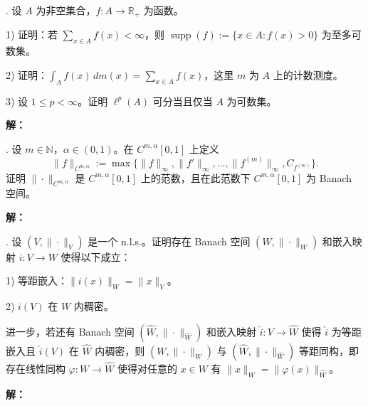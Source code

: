 \documentclass{article}
\begin{document}
\par\medskip

\par\medskip{}. 设 $A$ 为非空集合，$f:A\to\mathbb R_+$ 为函数。

1) 证明：若 $\sum_{x\in A}f(x)<\infty$，则 $\operatorname{supp}(f):=\{x\in A:f(x)>0\}$ 为至多可数集。

2) 证明：$\int_A f(x)\,dm(x)=\sum_{x\in A}f(x)$，这里 $m$ 为 $A$ 上的计数测度。

3) 设 $1\le p<\infty$。证明 $\ell^p(A)$ 可分当且仅当 $A$ 为可数集。


\par\nopagebreak[4]\noindent\textbf{解：}



\par\medskip

\par\medskip{}. 设 $m\in\mathbb N$，$\alpha\in(0,1)$。在 $C^{m,\alpha}[0,1]$ 上定义
\[
\|f\|_{C^{m,\alpha}}:=\max\{\|f\|_\infty,\|f'\|_\infty,\ldots,\|f^{(m)}\|_\infty,C_{f^{(m)}}\}.
\]
证明 $\|\cdot\|_{C^{m,\alpha}}$ 是 $C^{m,\alpha}[0,1]$ 上的范数，且在此范数下 $C^{m,\alpha}[0,1]$ 为 Banach 空间。


\par\nopagebreak[4]\noindent\textbf{解：}



\par\medskip

\par\medskip{}. 设 $(V,\|\cdot\|_V)$ 是一个 n.l.s.。证明存在 Banach 空间 $(W,\|\cdot\|_W)$ 和嵌入映射 $i:V\to W$ 使得以下成立：

1) 等距嵌入：$\|i(x)\|_W=\|x\|_V$。

2) $i(V)$ 在 $W$ 内稠密。

进一步，若还有 Banach 空间 $(\widehat W,\|\cdot\|_{\widehat W})$ 和嵌入映射 $\widehat i:V\to\widehat W$ 使得 $\widehat i$ 为等距嵌入且 $\widehat i(V)$ 在 $\widehat W$ 内稠密，则 $(W,\|\cdot\|_W)$ 与 $(\widehat W,\|\cdot\|_{\widehat W})$ 等距同构，即存在线性同构 $\varphi:W\to\widehat W$ 使得对任意的 $x\in W$ 有 $\|x\|_W=\|\varphi(x)\|_{\widehat W}$。


\par\nopagebreak[4]\noindent\textbf{解：}



\par\medskip
\end{document}

